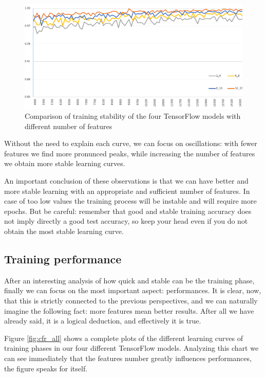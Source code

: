 \begin{figure}
	\centering
	\includegraphics[width=1\textwidth]{Images/training_stability}
	\caption{Comparison of training stability of the four TensorFlow models with different number of features}
	\label{fig:training_stability}
\end{figure}

Without the need to explain each curve, we can focus on oscillations: with fewer features we find more pronunced peaks, while increasing the number of features we obtain more stable learning curves.

An important conclusion of these observations is that we can have better and more stable learning with an appropriate and sufficient number of features. In case of too low values the training process will be instable and will require more epochs. But be careful: remember that good and stable training accuracy does not imply directly a good test accuracy, so keep your head even if you do not obtain the most stable learning curve.

\subsection{Training performance}

After an interesting analysis of how quick and stable can be the training phase, finally we can focus on the most important aspect: performances. It is clear, now, that this is strictly connected to the previous perspectives, and we can naturally imagine the following fact: more features mean better results. After all we have already said, it is a logical deduction, and effectively it is true.

Figure \ref{fig:cfr_all} shows a complete plots of the different learning curves of training phases in our four different TensorFlow models. Analyzing this chart we can see immediately that the features number greatly influences performances, the figure speaks for itself.

